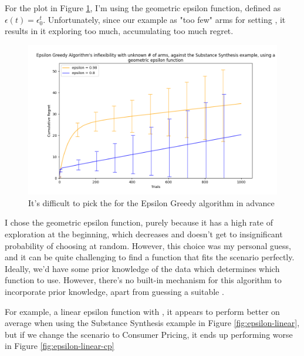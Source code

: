 For the plot in Figure \ref{fig:epsilon-degrade}, I'm using the geometric epsilon function, defined as $\epsilon(t) = \epsilon_0^t$. Unfortunately, since our example as "too few" arms for setting , it results in it exploring too much, accumulating too much regret.


\begin{figure}[h!]
    \centering
    \includegraphics[width=17cm]{report/images/Epsilon-Greedy-SS-Poor-Degredation.png}
    \caption{It's difficult to pick the \epsilonFunction \space for the Epsilon Greedy algorithm in advance}
    \label{fig:epsilon-degrade}
\end{figure}

I chose the geometric epsilon function, purely because it has a high rate of exploration at the beginning, which decreases and doesn't get to insignificant probability of choosing at random. However, this choice was my personal guess, and it can be quite challenging to find a function that fits the scenario perfectly. Ideally, we'd have some prior knowledge of the data which determines which function to use. However, there's no built-in mechanism for this algorithm to incorporate prior knowledge, apart from guessing a suitable \epsilonFunction.

For example, a linear epsilon function with , it appears to perform better on average when using the Substance Synthesis example in Figure \ref{fig:epsilon-linear}, but if we change the scenario to Consumer Pricing, it ends up performing worse in Figure \ref{fig:epsilon-linear-cp}

